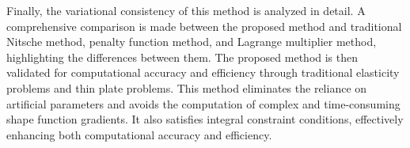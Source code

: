 \documentclass[engineeringmaster]{hquThesis}
\begin{document}
\begin{abstractEn}
Finally, the variational consistency of this method is analyzed in detail. A comprehensive comparison is made between the proposed method and traditional Nitsche method, penalty function method, and Lagrange multiplier method, highlighting the differences between them. The proposed method is then validated for computational accuracy and efficiency through traditional elasticity problems and thin plate problems.
This method eliminates the reliance on artificial parameters and avoids the computation of complex and time-consuming shape function gradients. It also satisfies integral constraint conditions, effectively enhancing both computational accuracy and efficiency.
\end{abstractEn}
\tableofcontents





\mainmatter









\begin{appendices}
\appendix
\setcounter{equation}{0}
\renewcommand\theequation{A.\arabic{equation}}

\renewcommand\theequation{B.\arabic{equation}}


\end{appendices}










\renewcommand{\appendixname}{Appendix~\Alph{chapter}}

\end{document}

